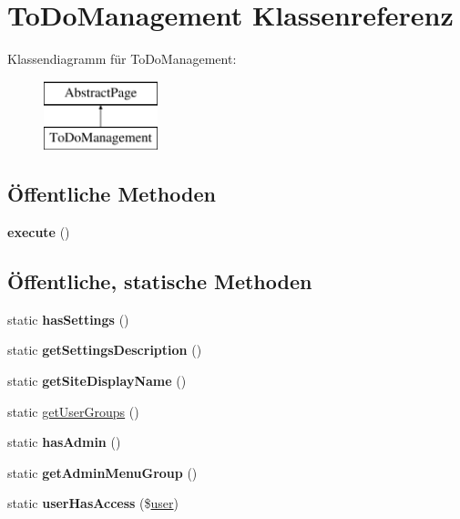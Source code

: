 \hypertarget{class_to_do_management}{}\section{To\+Do\+Management Klassenreferenz}
\label{class_to_do_management}
Klassendiagramm für To\+Do\+Management\+:\begin{figure}[H]
\begin{center}
\leavevmode
\includegraphics[height=2.000000cm]{class_to_do_management}
\end{center}
\end{figure}
\subsection*{Öffentliche Methoden}
\begin{DoxyCompactItemize}
\item 
\mbox{\label{class_to_do_management_a1fb23eed9967cbe3be154bac4606bb03}} 
{\bfseries execute} ()
\end{DoxyCompactItemize}
\subsection*{Öffentliche, statische Methoden}
\begin{DoxyCompactItemize}
\item 
\mbox{\label{class_to_do_management_aed4f1cc71aa0b1c136a389d014ba2966}} 
static {\bfseries has\+Settings} ()
\item 
\mbox{\label{class_to_do_management_ad8b8084860adb9ca82462c9d5834089f}} 
static {\bfseries get\+Settings\+Description} ()
\item 
\mbox{\label{class_to_do_management_a02ec9ecd588c372bd0c7db0d1c7c3440}} 
static {\bfseries get\+Site\+Display\+Name} ()
\item 
static \mbox{\hyperlink{class_to_do_management_ac91d65d74167e85d0875e587eaff7c66}{get\+User\+Groups}} ()
\item 
\mbox{\label{class_to_do_management_aa9410a044af50396bfbaeba3e85fb689}} 
static {\bfseries has\+Admin} ()
\item 
\mbox{\label{class_to_do_management_a5d114eddf1880f4ed506f1080ba768ca}} 
static {\bfseries get\+Admin\+Menu\+Group} ()
\item 
\mbox{\label{class_to_do_management_a607188a676a0033bb67d162eab71d9a8}} 
static {\bfseries user\+Has\+Access} (\$\mbox{\hyperlink{classuser}{user}})
\end{DoxyCompactItemize}
